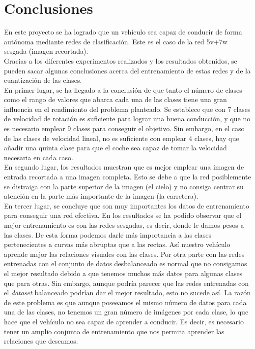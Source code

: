 \section{Conclusiones}

En este proyecto se ha logrado que un vehículo sea capaz de conducir de forma autónoma mediante redes de clasificación. Este es el caso de la red 5v+7w sesgada (imagen recortada).\\

Gracias a los diferentes experimentos realizados y los resultados obtenidos, se pueden sacar algunas conclusiones acerca del entrenamiento de estas redes y de la cuantización de las clases.\\

En primer lugar, se ha llegado a la conclusión de que tanto el número de clases como el rango de valores que abarca cada una de las clases tiene una gran influencia en el rendimiento del problema planteado. Se establece que con 7 clases de velocidad de rotación es suficiente para lograr una buena conducción, y que no es necesario emplear 9 clases para conseguir el objetivo. Sin embargo, en el caso de las clases de velocidad lineal, no es suficiente con emplear 4 clases, hay que añadir una quinta clase para que el coche sea capaz de tomar la velocidad necesaria en cada caso.\\

En segundo lugar, los resultados muestran que es mejor emplear una imagen de entrada recortada a una imagen completa. Esto se debe a que la red posiblemente se distraiga con la parte superior de la imagen (el cielo) y no consiga centrar su atención en la parte más importante de la imagen (la carretera).\\

En tercer lugar, se concluye que son muy importantes los datos de entrenamiento para conseguir una red efectiva. En los resultados se ha podido observar que el mejor entrenamiento es con las redes sesgadas, es decir, donde le damos pesos a las clases. De esta forma podemos darle más importancia a las clases pertenecientes a curvas más abruptas que a las rectas. Así nuestro vehículo aprende mejor las relaciones visuales con las clases. Por otra parte con las redes entrenadas con el conjunto de datos desbalanceado es normal que no consigamos el mejor resultado debido a que tenemos muchos más datos para algunas clases que para otras. Sin embargo, aunque podría parecer que las redes entrenadas con el \textit{dataset} balanceado podrían dar el mejor resultado, esto no sucede así. La razón de este problema es que aunque poseeamos el mismo número de datos para cada una de las clases, no tenemos un gran número de imágenes por cada clase, lo que hace que el vehículo no sea capaz de aprender a conducir. Es decir, es necesario tener un amplio conjunto de entrenamiento que nos permita aprender las relaciones que deseamos.\\

